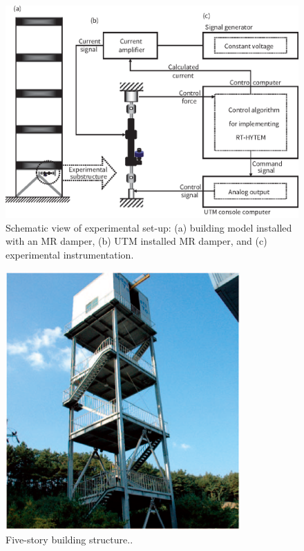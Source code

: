\begin{figure}[ht]
\centering
\includegraphics[width=1\textwidth] {figure/8-3.eps}
\caption{Schematic view of experimental set-up: (a) building model installed with an MR damper, (b) UTM installed MR damper, and (c) experimental instrumentation.}
\label{fig:8-3}
\end{figure}

\begin{figure}[ht]
\centering
\includegraphics[width=0.8\textwidth] {figure/8-4.eps}
\caption{Five-story building structure..}
\label{fig:8-3}
\end{figure}

